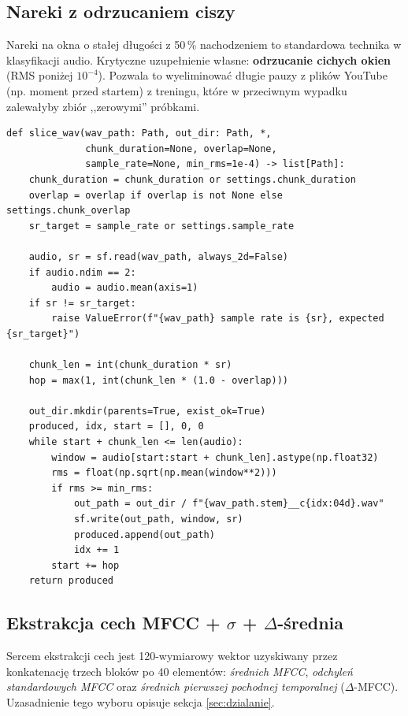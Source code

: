 \documentclass[11pt,a4paper]{article}
\newcommand{\sectionref}[1]{sekcja \ref{#1}}
\begin{document}
\subsection{Nareki z odrzucaniem ciszy}

Nareki na okna o stałej długości z 50\,\% nachodzeniem to standardowa technika
w klasyfikacji audio. Krytyczne uzupełnienie własne: \textbf{odrzucanie cichych
okien} (RMS poniżej $10^{-4}$). Pozwala to wyeliminować długie pauzy z plików
YouTube (np. moment przed startem) z treningu, które w przeciwnym wypadku
zalewałyby zbiór ,,zerowymi'' próbkami.

\begin{lstlisting}[caption={Slicing z filtrem RMS (\texttt{data/chunk.py}).},label={lst:chunk}]
def slice_wav(wav_path: Path, out_dir: Path, *,
              chunk_duration=None, overlap=None,
              sample_rate=None, min_rms=1e-4) -> list[Path]:
    chunk_duration = chunk_duration or settings.chunk_duration
    overlap = overlap if overlap is not None else settings.chunk_overlap
    sr_target = sample_rate or settings.sample_rate

    audio, sr = sf.read(wav_path, always_2d=False)
    if audio.ndim == 2:
        audio = audio.mean(axis=1)
    if sr != sr_target:
        raise ValueError(f"{wav_path} sample rate is {sr}, expected {sr_target}")

    chunk_len = int(chunk_duration * sr)
    hop = max(1, int(chunk_len * (1.0 - overlap)))

    out_dir.mkdir(parents=True, exist_ok=True)
    produced, idx, start = [], 0, 0
    while start + chunk_len <= len(audio):
        window = audio[start:start + chunk_len].astype(np.float32)
        rms = float(np.sqrt(np.mean(window**2)))
        if rms >= min_rms:
            out_path = out_dir / f"{wav_path.stem}__c{idx:04d}.wav"
            sf.write(out_path, window, sr)
            produced.append(out_path)
            idx += 1
        start += hop
    return produced
\end{lstlisting}

\subsection{Ekstrakcja cech MFCC + $\sigma$ + $\Delta$-średnia}

Sercem ekstrakcji cech jest 120-wymiarowy wektor uzyskiwany przez konkatenację
trzech bloków po 40 elementów: \emph{średnich MFCC}, \emph{odchyleń standardowych
MFCC} oraz \emph{średnich pierwszej pochodnej temporalnej} ($\Delta$-MFCC).
Uzasadnienie tego wyboru opisuje \sectionref{sec:dzialanie}.
\end{document}
